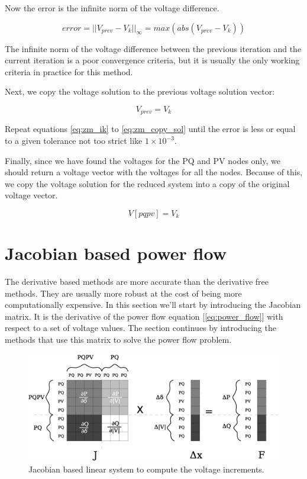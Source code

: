\documentclass[a4paper,twoside]{tufte-book}
\begin{document}
Now the error is the infinite norm of the voltage difference.

\begin{equation}
error = ||V_{prev} - V_k ||_{\infty} = max(abs(V_{prev} - V_k ))
\end{equation}

The infinite norm of the voltage difference between the previous iteration and the current iteration is a poor convergence criteria, but it is usually the only working criteria in practice for this method.

Next, we copy the voltage solution to the previous voltage solution vector:

\begin{equation}
V_{prev} = V_k
\label{eq:zm_copy_sol}
\end{equation}

Repeat equations \ref{eq:zm_ik} to \ref{eq:zm_copy_sol} until the error is less or equal to a given tolerance not too strict like $1\times10^{-3}$.

Finally, since we have found the voltages for the PQ and PV nodes only, we should return a voltage vector with the voltages for all the nodes. Because of this, we copy the voltage solution for the reduced system into a copy of the original voltage vector.

\begin{equation}
V[pqpv] = V_k
\end{equation}


\section{Jacobian based power flow}

The derivative based methods are more accurate than the derivative free methods. They are usually more robust at the cost of being more computationally expensive. In this section we'll start by introducing the Jacobian matrix. It is the derivative of the power flow equation  [\ref{eq:power_flow}] with respect to a set of voltage values. The section continues by introducing the methods that use this matrix to solve the power flow problem.

\begin{center}
\begin{figure}[h!]
  \includegraphics[width=0.9\linewidth]{img/JacobianBased.eps}
  \caption{Jacobian based linear system to compute the voltage increments.}
  \label{fig:jacobian_based}
\end{figure}
\end{center}
\end{document}
